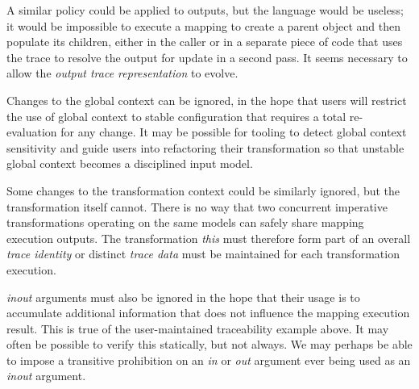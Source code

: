 \documentclass[runningheads,a4paper]{llncs}
\begin{document}
A similar policy could be applied to outputs, but the language would be useless; it would be impossible to execute a mapping to create a parent object and then populate its children, either in the caller or in a separate piece of code that uses the trace to resolve the output for update in a second pass. It seems necessary to allow the \emph{output trace representation} to evolve.

Changes to the global context can be ignored, in the hope that users will restrict the use of global context to stable configuration that requires a total re-evaluation for any change. It may be possible for tooling to detect global context sensitivity and guide users into refactoring their transformation so that unstable global context becomes a disciplined input model.  

Some changes to the transformation context could be similarly ignored, but the transformation itself cannot. There is no way that two concurrent imperative transformations operating on the same models can safely share mapping execution outputs. The transformation \emph{this} must therefore form part of an overall \emph{trace identity} or distinct \emph{trace data} must be maintained for each transformation execution.

\emph{inout} arguments must also be ignored in the hope that their usage is to accumulate additional information that does not influence the mapping execution result. This is true of the user-maintained traceability example above. It may often be possible to verify this statically, but not always. We may perhaps be able to impose a transitive prohibition on an \emph{in} or \emph{out} argument ever being used as an \emph{inout} argument.





\end{document}
